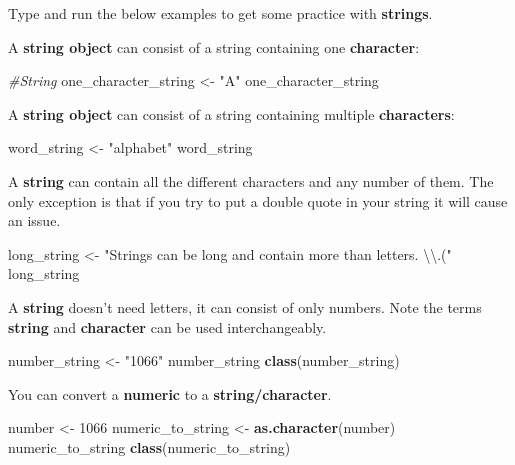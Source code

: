 \documentclass[]{book}
\newenvironment{Shaded}{\begin{snugshade}}{\end{snugshade}}
\newcommand{\KeywordTok}[1]{\textcolor[rgb]{0.13,0.29,0.53}{\textbf{#1}}}
\newcommand{\DecValTok}[1]{\textcolor[rgb]{0.00,0.00,0.81}{#1}}
\newcommand{\CharTok}[1]{\textcolor[rgb]{0.31,0.60,0.02}{#1}}
\newcommand{\StringTok}[1]{\textcolor[rgb]{0.31,0.60,0.02}{#1}}
\newcommand{\CommentTok}[1]{\textcolor[rgb]{0.56,0.35,0.01}{\textit{#1}}}
\newcommand{\NormalTok}[1]{#1}
\begin{document}
Type and run the below examples to get some practice with
\textbf{strings}.

A \textbf{string object} can consist of a string containing one
\textbf{character}:

\begin{Shaded}
\begin{Highlighting}[]
\CommentTok{#String}
\NormalTok{one_character_string <-}\StringTok{ "A"}
\NormalTok{one_character_string}
\end{Highlighting}
\end{Shaded}

A \textbf{string object} can consist of a string containing multiple
\textbf{characters}:

\begin{Shaded}
\begin{Highlighting}[]
\NormalTok{word_string <-}\StringTok{ "alphabet"}
\NormalTok{word_string}
\end{Highlighting}
\end{Shaded}

A \textbf{string} can contain all the different characters and any
number of them. The only exception is that if you try to put a double
quote in your string it will cause an issue.

\begin{Shaded}
\begin{Highlighting}[]
\NormalTok{long_string <-}\StringTok{ "Strings can be long and contain more than letters. }\CharTok{\textbackslash{}\textbackslash{}}\StringTok{.("}
\NormalTok{long_string}
\end{Highlighting}
\end{Shaded}

A \textbf{string} doesn't need letters, it can consist of only numbers.
Note the terms \textbf{string} and \textbf{character} can be used
interchangeably.

\begin{Shaded}
\begin{Highlighting}[]
\NormalTok{number_string <-}\StringTok{ "1066"}
\NormalTok{number_string}
\KeywordTok{class}\NormalTok{(number_string)}
\end{Highlighting}
\end{Shaded}

You can convert a \textbf{numeric} to a \textbf{string/character}.

\begin{Shaded}
\begin{Highlighting}[]
\NormalTok{number <-}\StringTok{ }\DecValTok{1066}
\NormalTok{numeric_to_string <-}\StringTok{ }\KeywordTok{as.character}\NormalTok{(number)}
\NormalTok{numeric_to_string}
\KeywordTok{class}\NormalTok{(numeric_to_string)}
\end{Highlighting}
\end{Shaded}
\end{document}
